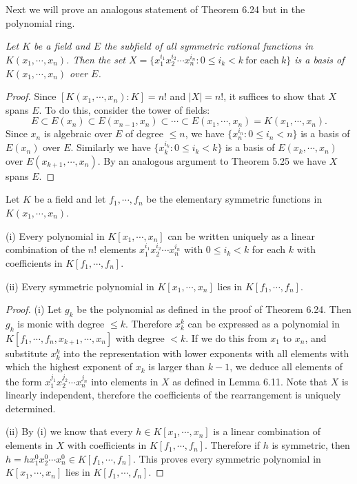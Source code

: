Next we will prove an analogous statement of Theorem 6.24 but in the polynomial ring.
\begin{lemma}\em
Let $K$ be a field and $E$ the subfield of all symmetric rational functions in $K(x_1,\cdots,x_n)$. Then the set $X=\{x_1^{i_1}x_2^{i_2}\cdots x_n^{i_n}:0\le i_k<k\ \text{for each}\ k\}$ is a basis of $K(x_1,\cdots,x_n)$ over $E$.
\end{lemma}
\begin{proof}
Since $[K(x_1,\cdots,x_n):K]=n!$ and $|X|=n!$, it suffices to show that $X$ spans $E$. To do this, consider the tower of fields: 
$$
E\subset E\left( x_n \right) \subset E\left( x_{n-1},x_n \right) \subset \cdots \subset E\left( x_1,\cdots ,x_n \right) =K\left( x_1,\cdots ,x_n \right) .
$$
Since $x_n$ is algebraic over $E$ of degree $\le n$, we have $\{x_n^{i_n}:0\le i_n<n\}$ is a basis of $E(x_n)$ over $E$. Similarly we have $\{x_k^{i_k}:0\le i_k<k\}$ is a basis of $E(x_k,\cdots,x_n)$ over $E(x_{k+1},\cdots,x_n)$. By an analogous argument to Theorem 5.25 we have $X$ spans $E$.
\end{proof}
\begin{proposition}
Let $K$ be a field and let $f_1,\cdots,f_n$ be the elementary symmetric functions in $K(x_1,\cdots,x_n)$.\par
(i) Every polynomial in $K[x_1,\cdots,x_n]$ can be written uniquely as a linear combination of the $n!$ elements $x_1^{i_1}x_2^{i_2}\cdots x_n^{i_n}$ with $0\le i_k<k$ for each $k$ with coefficients in $K[f_1,\cdots,f_n]$.\par
(ii) Every symmetric polynomial in $K[x_1,\cdots,x_n]$ lies in $K[f_1,\cdots,f_n]$.
\end{proposition}
\begin{proof}
(i) Let $g_k$ be the polynomial as defined in the proof of Theorem 6.24. Then $g_k$ is monic with degree $\le k$. Therefore $x_k^k$ can be expressed as a polynomial in $K[f_1,\cdots,f_n,x_{k+1},\cdots,x_n]$ with degree $<k$. If we do this from $x_1$ to $x_n$, and substitute $x_k^k$ into the representation with lower exponents with all elements with which the highest exponent of $x_k$ is larger than $k-1$, we deduce all elements of the form $x_1^{j_1}x_2^{j_2}\cdots x_n^{j_n}$ into elements in $X$ as defined in Lemma 6.11. Note that $X$ is linearly independent, therefore the coefficients of the rearrangement is uniquely determined.\par
(ii) By (i) we know that every $h\in K[x_1,\cdots,x_n]$ is a linear combination of elements in $X$ with coefficients in $K[f_1,\cdots,f_n]$. Therefore if $h$ is symmetric, then $h=hx_1^0x_2^0\cdots x_n^0\in K[f_1,\cdots,f_n]$. This proves every symmetric polynomial in $K[x_1,\cdots,x_n]$ lies in $K[f_1,\cdots,f_n]$.
\end{proof}
